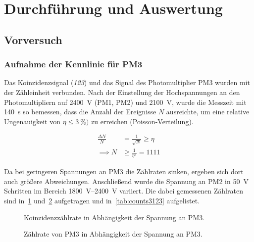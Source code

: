 \documentclass[slug=LM, room=Andreas-Schubert-Bau\,\ K\ 1A, supervisor=Anne-Sophie\ Berthold, coursedate=13.\ 12.\ 2019]{../../Lab_Report_LaTeX/lab_report}
\begin{document}
\section{Durchf\"uhrung und Auswertung}
\label{sec:durchaus}

\subsection{Vorversuch}
\label{sec:vorvers}
\subsubsection{Aufnahme der Kennlinie f\"ur PM3}
\label{sec:pm3kenn}

Das Koinzidenzsignal (\textit{123}) und das Signal des
Photomultiplier PM3 wurden mit der Z\"ahleinheit verbunden.  Nach der
Einstellung der Hochspannungen an den Photomultipliern auf
\SI{2400}{\volt} (PM1, PM2) und \SI{2100}{\volt}, wurde die Messzeit
mit \SI{140}{\second} so bemessen, dass die Anzahl der Ereignisse
\(N\) ausreichte, um eine relative Ungenauigkeit von
\(\eta \leq \SI{3}{\percent})\) zu erreichen (Poisson-Verteilung).

\begin{align}
\label{eq:mtime}
\frac{\Delta N}{N} &= \frac{1}{\sqrt{N}} \geq \eta \\
\implies N &\geq \frac{1}{\eta^2} = 1111
\end{align}

Da bei geringeren Spannungen an PM3 die Z\"ahlraten sinken, ergeben
sich dort auch gr\"o\ss{}ere Abweichungen.  Anschließend wurde die
Spannung an PM2 in \SI{50}{\volt} Schritten im Bereich
\SIrange{1800}{2400}{\volt} variiert.  Die dabei gemessenen
Z\"ahlraten sind in~\ref{fig:vorversuch-kennlinie_123}
und~\ref{fig:vorversuch-kennlinie_pm3} aufgetragen und
in~\ref{tab:counts3123} aufgelistet.

\begin{figure}[h]\centering
  
  \caption{Koinzidenzz\"ahlrate in Abh\"angigkeit der Spannung an PM3.}
  \label{fig:vorversuch-kennlinie_123}
\end{figure}

\begin{figure}[h]\centering
  
  \caption{Z\"ahlrate von PM3 in Abh\"angigkeit der Spannung an PM3.}
  \label{fig:vorversuch-kennlinie_pm3}
\end{figure}
\end{document}
